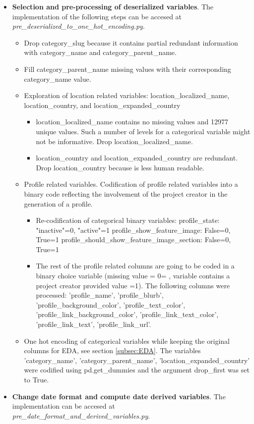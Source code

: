 \documentclass{article}
\begin{document}
{\begin{itemize}
    \item \textbf{Selection and pre-processing of deserialized variables}.
    The implementation of the following steps can be accesed at \emph{pre\_deserialized\_to\_one\_hot\_encoding.py}.
    \begin{itemize}
 
        \item Drop category\_slug because it contains partial redundant information with category\_name and category\_parent\_name.
        \item Fill category\_parent\_name missing values with their corresponding category\_name value.
        \item Exploration of location related variables: location\_localized\_name, location\_country, and location\_expanded\_country
	\begin{itemize}
            \item location\_localized\_name contains no missing values and 12977 unique values. Such a number of levels for a categorical variable might not be informative. Drop location\_localized\_name.
            \item location\_country and location\_expanded\_country are redundant. Drop location\_country because is less human readable.
	\end{itemize}
	\item Profile related variables. Codification of profile related variables into a binary code reflecting the involvement of the project creator in the generation of a profile.
	\begin{itemize}
            \item Re-codification of categorical binary variables:
	    profile\_state: "inactive"=0, "active"=1
            profile\_show\_feature\_image: False=0, True=1
            profile\_should\_show\_feature\_image\_section: False=0, True=1

            \item The rest of the profile related columns are going to be coded in a binary choice variable (missing value = 0= , variable contains a project creator provided value =1). The following columns were processed: 'profile\_name', 'profile\_blurb', 'profile\_background\_color', 'profile\_text\_color', 'profile\_link\_background\_color', 'profile\_link\_text\_color', 'profile\_link\_text', 'profile\_link\_url'.
        \end{itemize}
	\item One hot encoding of categorical variables while keeping the original columns for EDA, see section \ref{subsec:EDA}.
        The variables 'category\_name', 'category\_parent\_name', 'location\_expanded\_country' were codified using pd.get\_dummies and the argument drop\_first was set to True.
   \end{itemize}
   \item \textbf{Change date format and compute date derived variables}.
    The implementation can be accesed at \emph{pre\_date\_format\_and\_derived\_variables.py}.
    

\end{itemize}}
\end{document}
